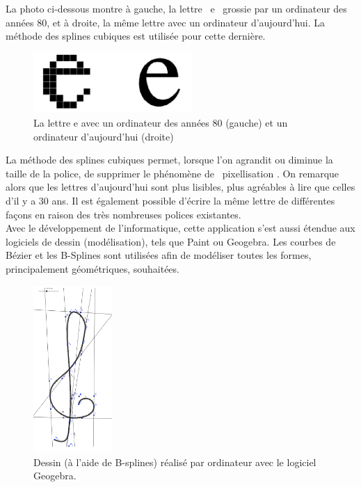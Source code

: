 \documentclass{article}
\begin{document}
La photo ci-dessous montre \`a gauche, la lettre \guillemotleft \ e \guillemotright \ grossie par un ordinateur des ann\'{e}es 80, et \`a droite, la m\^{e}me lettre avec un ordinateur d'aujourd'hui. La m\'{e}thode des splines cubiques est utilis\'{e}e pour cette derni\`{e}re.

\begin{figure}[h]
	\centering
	\includegraphics[width=6cm]{Typographie.png}
	\caption{La lettre e avec un ordinateur des ann\'{e}es 80 (gauche) et un ordinateur d'aujourd'hui (droite)}
\end{figure}

La m\'{e}thode des splines cubiques permet, lorsque l'on agrandit ou diminue la taille de la police, de supprimer le ph\'{e}nom\`{e}ne de \guillemotleft \ pixellisation \guillemotright. On remarque alors que les lettres d'aujourd'hui sont plus lisibles, plus agr\'{e}ables \`a lire que celles d'il y a 30 ans. Il est \'{e}galement possible d'\'{e}crire la m\^{e}me lettre de  diff\'{e}rentes fa\c cons en raison des tr\`{e}s nombreuses polices existantes.\\

Avec le d\'{e}veloppement de l'informatique, cette application s'est aussi \'{e}tendue aux logiciels de dessin (mod\'{e}lisation), tels que Paint ou Geogebra. Les courbes de B\'{e}zier et les B-Splines sont utilis\'{e}es afin de mod\'{e}liser toutes les formes,  principalement g\'{e}om\'{e}triques, souhait\'{e}es. 

\newpage

\begin{figure}[h]
	\centering
	\includegraphics[width=3cm]{ClefSol.png}
	\caption{Dessin (\`a l'aide de B-splines) r\'{e}alis\'{e} par ordinateur avec le logiciel Geogebra.}
\end{figure}
\end{document}
